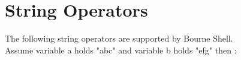 \documentclass{article}
\begin{document}
\section*{String Operators}
The following string operators are supported by Bourne Shell.\\
Assume variable a holds "abc" and variable b holds "efg" then :
\begin{center}
\end{center}

\end{document}
